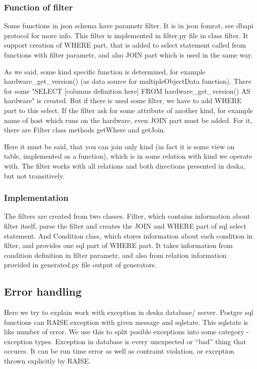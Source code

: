 \documentclass[deska]{subfiles}
\begin{document}
\subsubsection{Function of filter}

Some functions in json schema have parametr filter. It is in json fomrat, see dbapi protocol for more info.
This filter is implemented in filter.py file in class filter. It support creation of WHERE part, that is added to select statement called from functions with filter parametr, and also JOIN part which is used in the same way.

As we said, some kind specific function is determined, for example hardware\_get\_version() (as data source for multipleObjectData function). There for some "SELECT [columns definition here] FROM hardware\_get\_version() AS hardware" is created. But if there is used some filter, we have to add WHERE part to this select. If the filter ask for some attribute of another kind, for example name of host which runs on the hardware, even JOIN part must be added. For it, there are Filter class methods getWhere and getJoin. 

Here it must be said, that you can join only kind (in fact it is some view on table, implemented as a function), which is in some relation with kind we operate with. The filter works with all relations and both directions presented in deska, but not transitively.

\subsubsection{Implementation}

The filters are created from two classes. Filter, which contains information about filter itself, parse the filter and creates
the JOIN and WHERE part of sql select statement. And Condition class, which stores information about each condition in filter, and provides
one sql part of WHERE part. It takes information from condition definition in filter parametr, and also from relation information provided
in generated.py file output of generators.

\subsection{Error handling}
Here we try to explain work with exception in deska database/ server. Postgre sql functions can RAISE exception with given message and sqlstate.
This sqlstate is like number of error. We use this to split posible exceptions into some category - exception types. Exception in database is
every unexpected or “bad” thing that occures. It can be run time error as well as contraint violation, or exception thrown explicitly by RAISE.
\end{document}
